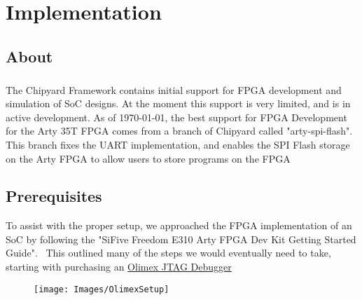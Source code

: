 \chapter{\texorpdfstring{}{FPGA} Implementation}\label{chap:FPGA_Implementation}

\section{About}\label{sec:About}
\paragraph{}The Chipyard Framework contains initial support for FPGA development and simulation of SoC designs. 
At the moment this support is very limited, and is in active development. 
As of \today, the best support for FPGA Development for the Arty 35T FPGA comes from a branch of Chipyard called "arty-spi-flash". 
This branch fixes the UART implementation, and enables the SPI Flash storage on the Arty FPGA to allow users to store programs on the FPGA


\section{Prerequisites}\label{sec:Prerequisites}
To assist with the proper setup, we approached the FPGA implementation of an SoC by following the "SiFive Freedom E310 Arty FPGA Dev Kit Getting Started Guide".~\cite{FreedomDevGuide}
This outlined many of the steps we would eventually need to take, starting with purchasing an \href{https://www.digikey.com/en/products/detail/olimex-ltd/ARM-USB-TINY-H/3471388}{Olimex JTAG Debugger}~\cite{OlimexJTAG}

\begin{figure}[h]
	\centering
	\texttt{[image: Images/OlimexSetup]}
	\caption[Olimex Debugger Setup]{}
	\caption{}
	\label{fig:olimexsetup}
	\cite[p.~5]{FreedomDevGuide}
\end{figure}

